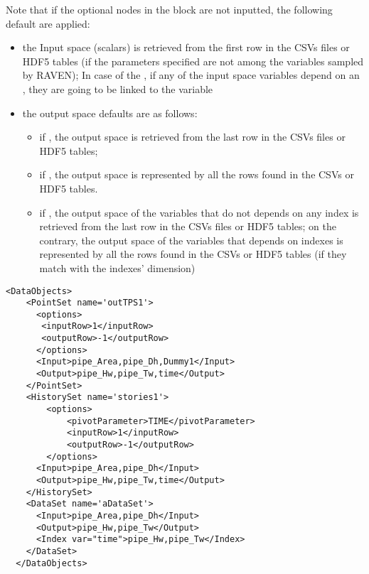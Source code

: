Note that if the optional nodes in the block  are not inputted, the following default are applied:
\begin{itemize}
   \item the Input space (scalars) is retrieved from the first row in the CSVs files or HDF5 tables (if the parameters specified are not
      among the variables sampled by RAVEN); In case of the  , if any of the input space variables depend on an , they
      are going to be linked to the  variable
   \item  the output space defaults are as follows:
   \begin{itemize}
       \item if , the output space is retrieved from the last row in the CSVs files or HDF5 tables;
       \item if , the output space is represented by all the rows found in  the CSVs or HDF5 tables.
       \item if , the output space of the variables that do not depends on any index is retrieved from the last row in the CSVs files or HDF5 tables;
       on the contrary, the output space of the variables that depends on indexes is represented by all the rows found in  the CSVs or HDF5 tables (if they match
       with the indexes' dimension)
    \end{itemize}
\end{itemize}


\begin{lstlisting}[style=XML,morekeywords={operator,hierarchical,name,var}]
  <DataObjects>
    <PointSet name='outTPS1'>
      <options>
       <inputRow>1</inputRow>
       <outputRow>-1</outputRow>
      </options>
      <Input>pipe_Area,pipe_Dh,Dummy1</Input>
      <Output>pipe_Hw,pipe_Tw,time</Output>
    </PointSet>
    <HistorySet name='stories1'>
        <options>
            <pivotParameter>TIME</pivotParameter>
            <inputRow>1</inputRow>
            <outputRow>-1</outputRow>
        </options>
      <Input>pipe_Area,pipe_Dh</Input>
      <Output>pipe_Hw,pipe_Tw,time</Output>
    </HistorySet>
    <DataSet name='aDataSet'>
      <Input>pipe_Area,pipe_Dh</Input>
      <Output>pipe_Hw,pipe_Tw</Output>
      <Index var="time">pipe_Hw,pipe_Tw</Index>
    </DataSet>
  </DataObjects>
\end{lstlisting}

